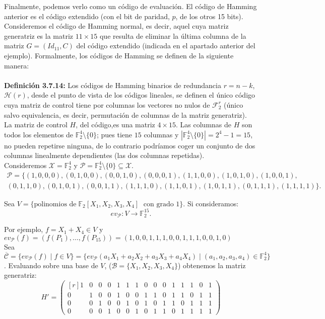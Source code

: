\documentclass[11pt,spanish]{book}
\begin{document}
Finalmente, podemos verlo como un código de evaluación. El código de Hamming anterior es el código extendido (con el bit de paridad, $p$, de los otros 15 bits). Consideremos el código de Hamming normal, es decir, aquel cuya matriz generatriz es la matriz $11\times 15$ que resulta de eliminar la última columna de la matriz $G=(Id_{11},C)$ del código extendido (indicada en el apartado anterior del ejemplo). Formalmente, los códigos de Hamming se definen de la siguiente manera:\\
\\ \textbf{Definición 3.7.14: } Los códigos de Hamming binarios de redundancia $r=n-k$, $\mathcal{H}(r)$, desde el punto de vista de los códigos lineales, se definen el único código cuya matriz de control tiene por columnas los vectores no nulos de $\mathcal{F}_{2}^{r}$ (único salvo equivalencia, es decir, permutación de columnas de la matriz generatriz). \\

La matriz de control $H$, del código,es una matriz $4\times 15$. Las columnas de $H$ son todos los elementos de $\mathbb{F}_{2}^{4}\setminus\{0\}$; pues tiene $15$ columnas y $|\mathbb{F}_2^4\setminus\{0\}|=2^4-1=15$, no pueden repetirse ninguna, de lo contrario podríamos coger un conjunto de dos columnas linealmente dependientes (las dos columnas repetidas).\\

Consideremos $\mathcal{X}=\mathbb{F}_{2}^{4}$ y $\mathcal{P}=\mathbb{F}_2^4\setminus\{0\}\subseteq \mathcal{X}$.
\begin{align*}
\mathcal{P} =\{(1,0,0,0), (0,1,0,0),(0,0,1,0), (0,0,0,1),(1,1,0,0),(1,0,1,0),(1,0,0,1),\\
(0,1,1,0), (0,1,0,1), (0,0,1,1), (1,1,1,0),(1,1,0,1), (1,0,1,1), (0,1,1,1), (1,1,1,1)\}. 
\end{align*}

Sea $V=\{\text{polinomios de}\;\mathbb{F}_{2}[X_1,X_2,X_3,X_4]\;\text{ con grado 1}\}$. Si consideramos:
$$ev_{\mathcal{P}}:V\longrightarrow \mathbb{F}_{2}^{15 }.$$

Por ejemplo, $f=X_1+X_4\in V$ y $ev_{\mathcal{P}}(f)=(f(P_1),\ldots,f(P_{15}))=(1,0,0,1, 1,1,0,0, 1,1,1,0, 0,1,0)$\\
Sea $\overline{\mathcal{C}}=\{ev_{\mathcal{P}}(f)\;|\;f\in V\}=\{ev_{\mathcal{P}}(a_1 X_1 +a_2 X_2+a_3 X_3+a_4 X_4)\;|\;(a_1,a_2,a_3,a_4)\in\mathbb{F}_2^{4}\}$. Evaluando sobre una base de $V$, ($\mathcal{B}=\{X_1,X_2,X_3,X_4\}$) obtenemos la matriz generatriz:
\[ 
H'=
\begin{pmatrix*}[r]
1  &  0  &  0  &  0  &  1  &  1  &  1  &  0  &  0  &  0  &  1  &  1  &  1  &  0  &  1\\
0  &  1  &  0  &  0  &  1  &  0  &  0  &  1  &  1  &  0  &  1  &  1  &  0  &  1  &  1\\
0  &  0  &  1  &  0  &  0  &  1  &  0  &  1  &  0  &  1  &  1  &  0  &  1  &  1  &  1\\
0  &  0  &  0  &  1  &  0  &  0  &  1  &  0  &  1  &  1  &  0  &  1  &  1  &  1  &  1
\end{pmatrix*}
\]
\end{document}
